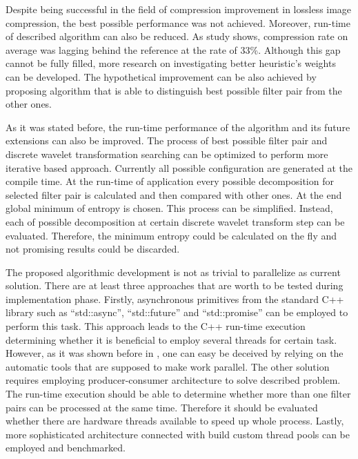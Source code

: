 Despite being successful in the field of compression improvement in lossless image compression, the best
possible performance was not achieved. Moreover, run-time of described algorithm can also be reduced.
As study shows, compression rate on average was lagging behind the reference at the rate of 33\%. Although
this gap cannot be fully filled, more research on investigating better heuristic’s weights can be developed.
The hypothetical improvement can be also achieved by proposing algorithm that is able to distinguish best
possible filter pair from the other ones.

As it was stated before, the run-time performance of the algorithm and its future extensions can also be improved.
The process of best possible filter pair and discrete wavelet transformation searching can be optimized to perform
more iterative based approach. Currently all possible configuration are generated at the compile time. At the
run-time of application every possible decomposition for selected filter pair is calculated and then compared
with other ones. At the end global minimum of entropy is chosen. This process can be simplified. Instead, each of
possible decomposition at certain discrete wavelet transform step can be evaluated. Therefore, the minimum entropy
could be calculated on the fly and not promising results could be discarded.

The proposed algorithmic development is not as trivial to parallelize as current solution. There are at least
three approaches that are worth to be tested during implementation phase. Firstly, asynchronous primitives from
the standard C++ library such as ``std::async'', ``std::future'' and ``std::promise'' can be employed to perform
this task. This approach leads to the C++ run-time execution determining whether it is beneficial to employ several
threads for certain task. However, as it was shown before in , one can easy be deceived by relying
on the automatic tools that are supposed to make work parallel. The other solution requires employing producer-consumer
architecture to solve described problem. The run-time execution should be able to determine whether more than one
filter pairs can be processed at the same time. Therefore it should be evaluated whether there are hardware threads
available to speed up whole process. Lastly, more sophisticated architecture connected with build custom thread
pools can be employed and benchmarked.

